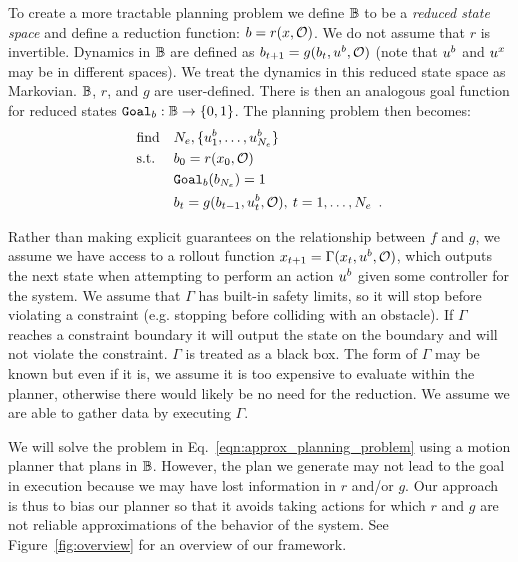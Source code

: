 To create a more tractable planning problem we define $\mathbb{B}$ to be a \textit{reduced state space} and define a reduction function: $b = r(x,\mathcal{O})$. We do not assume that $r$ is invertible. Dynamics in $\mathbb{B}$ are defined as $b_{t+1} = g(b_t,u^b,\mathcal{O})$ (note that $u^b$ and $u^x$ may be in different spaces). We treat the dynamics in this reduced state space as Markovian. $\mathbb{B}$, $r$, and $g$ are user-defined. There is then an analogous goal function for reduced states $\texttt{Goal}_b: \mathbb{B} \rightarrow \{ 0,1 \}$.  The planning problem then becomes:
\begin{equation}
    \begin{aligned}
        & \text{find}   & & N_e, \{u^b_1, \dots, u^b_{N_e} \} \\
        & \text{s.t.}   & & b_0 = r(x_0,\mathcal{O}) \\
        &               & &  \texttt{Goal}_b(b_{N_e}) = 1\\
        &               & & b_{t} = g(b_{t-1},u^b_t,\mathcal{O}), \:  t = 1, \dots, N_e \enspace . \\
    \end{aligned}
    \label{eqn:approx_planning_problem}
\end{equation}

Rather than making explicit guarantees on the relationship between $f$ and $g$, we assume we have access to a rollout function $x_{t+1} = \Gamma(x_t, u^b, \mathcal{O})$, which outputs the next state when attempting to perform an action $u^b$ given some controller for the system. We assume that $\Gamma$ has built-in safety limits, so it will stop before violating a constraint (e.g. stopping before colliding with an obstacle). If $\Gamma$ reaches a constraint boundary it will output the state on the boundary and will not violate the constraint. $\Gamma$ is treated as a black box. The form of $\Gamma$ may be known but even if it is, we assume it is too expensive to evaluate within the planner, otherwise there would likely be no need for the reduction. We assume we are able to gather data by executing $\Gamma$.

We will solve the problem in Eq.~\eqref{eqn:approx_planning_problem} using a motion planner that plans in $\mathbb{B}$. However, the plan we generate may not lead to the goal in execution because we may have lost information in $r$ and/or $g$. Our approach is thus to bias our planner so that it avoids taking actions for which $r$ and $g$ are not reliable approximations of the behavior of the system. See Figure~\ref{fig:overview} for an overview of our framework.

